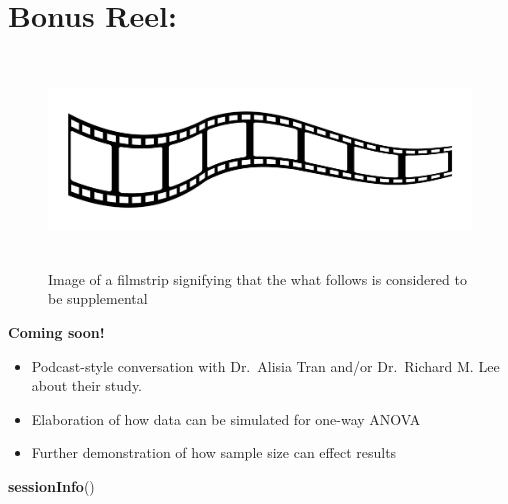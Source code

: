 \documentclass[
  english,
]{book}
\newenvironment{Shaded}{\begin{snugshade}}{\end{snugshade}}
\newcommand{\KeywordTok}[1]{\textcolor[rgb]{0.13,0.29,0.53}{\textbf{#1}}}
\newcommand{\NormalTok}[1]{#1}
\providecommand{\tightlist}{%
  \setlength{\itemsep}{0pt}\setlength{\parskip}{0pt}}
\begin{document}
\hypertarget{bonus-reel}{%
\section{Bonus Reel:}\label{bonus-reel}}

\begin{figure}
\hypertarget{id}{%
\centering
\includegraphics[width=6.45833in,height=2.19792in]{images/film-strip-1.jpg}
\caption{Image of a filmstrip signifying that the what follows is considered to be supplemental}\label{id}
}
\end{figure}

\textbf{Coming soon!}

\begin{itemize}
\tightlist
\item
  Podcast-style conversation with Dr.~Alisia Tran and/or Dr.~Richard M. Lee about their study.
\item
  Elaboration of how data can be simulated for one-way ANOVA
\item
  Further demonstration of how sample size can effect results
\end{itemize}

\begin{Shaded}
\begin{Highlighting}[]
\KeywordTok{sessionInfo}\NormalTok{()}
\end{Highlighting}
\end{Shaded}
\end{document}
